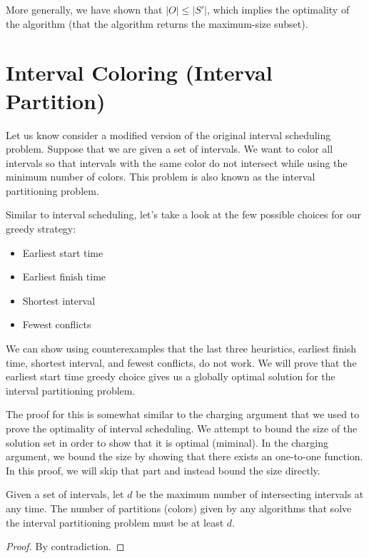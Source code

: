 More generally, we have shown that $|O| \leq |S'|$, which implies the optimality of the algorithm (that the algorithm returns the maximum-size subset).

\section{Interval Coloring (Interval Partition)}

Let us know consider a modified version of the original interval scheduling problem. Suppose that we are given a set of intervals. We want to color all intervals so that intervals with the same color do not intersect while using the minimum number of colors. This problem is also known as the interval partitioning problem.

Similar to interval scheduling, let's take a look at the few possible choices for our greedy strategy:
\begin{itemize}
    \item Earliest start time
    \item Earliest finish time
    \item Shortest interval
    \item Fewest conflicts
\end{itemize}
We can show using counterexamples that the last three heuristics, earliest finish time, shortest interval, and fewest conflicts, do not work. We will prove that the earliest start time greedy choice gives us a globally optimal solution for the interval partitioning problem.

The proof for this is somewhat similar to the charging argument that we used to prove the optimality of interval scheduling. We attempt to bound the size of the solution set in order to show that it is optimal (miminal). In the charging argument, we bound the size by showing that there exists an one-to-one function. In this proof, we will skip that part and instead bound the size directly.

\begin{lemma} \label{lem:interval-partition-upper-bound}
    Given a set of intervals, let $d$ be the maximum number of intersecting intervals at any time. The number of partitions (colors) given by any algorithms that solve the interval partitioning problem must be at least $d$.
\end{lemma}

\begin{proof}
    By contradiction.
\end{proof}

